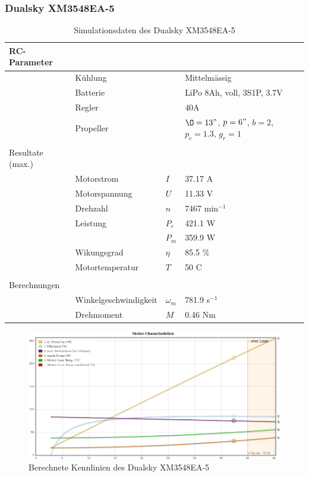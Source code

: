 \subsubsection*{Dualsky XM3548EA-5}

\begin{table}[h!]
	\centering
	\begin{tabular}{l l l l}
		RC-Parameter & & & \\ \hline
			& Kühlung	& & Mittelmässig \\
			& Batterie	& & LiPo 8Ah, voll, 3S1P, 3.7V \\
			& Regler	& & 40A \\
			& Propeller	& & $\O=13"$, $p=6"$, $b=2$, $p_c=1.3$, $g_r=1$ \\
			& & & \\
		Resultate (max.) & & & \\ \hline
			& Motorstrom	& $I$	& 37.17 A \\
			& Motorspannung	& $U$	& 11.33 V \\
			& Drehzahl	& $n$	& 7467 min$^{-1}$ \\
			& Leistung 	& $P_e$	& 421.1 W \\
			&		& $P_m$	& 359.9 W \\
			& Wikungsgrad	& $\eta$& 85.5 \% \\
			& Motortemperatur
					& $T$	& 50 C \\
			& & & \\
		Berechnungen & & & \\ \hline
			& Winkelgeschwindigkeit
					& $\omega_m$	& 781.9 s$^{-1}$ \\
			& Drehmoment	& $M$		& 0.46 Nm
	\end{tabular}
	\caption{Simulationsdaten des Dualsky XM3548EA-5}
\end{table}

\begin{figure}[h!]
	\centering
	\includegraphics[width=1\textwidth]{../../fig/motor/ecalc_XM3548EA-5.png}
	\caption{Berechnete Kennlinien des Dualsky XM3548EA-5}
	\label{fig:ecalc_xm3548ea_5}
\end{figure}
